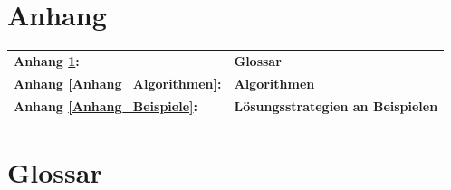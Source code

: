 \chapter*{Anhang}\label{Anhang}

\begin{tabular}{ll}
\bf Anhang \ref{Anhang_Glossar}: &\bf Glossar\\
\bf Anhang \ref{Anhang_Algorithmen}: &\bf Algorithmen\\
\bf Anhang \ref{Anhang_Beispiele}: &\bf Lösungsstrategien an Beispielen
\end{tabular}

\chapter{Glossar}\label{Anhang_Glossar}

